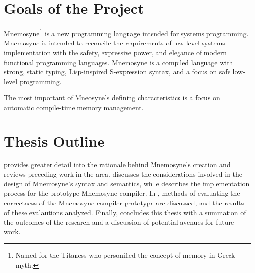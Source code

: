 \section{Goals of the Project}\label{sec:goals}

Mnemosyne\footnote{Named for the Titaness who personified the concept of memory in Greek myth.} is a new programming language intended for systems programming. Mnemosyne is intended to reconcile the requirements of low-level systems implementation with the safety, expressive power, and elegance of modern functional programming languages. Mnemosyne is a compiled language with strong, static typing, Lisp-inspired S-expression syntax, and a focus on safe low-level programming.

The most important of Mneosyne's defining characteristics is a focus on automatic compile-time memory management.

\section{Thesis Outline}\label{sec:outline}

 provides greater detail into the rationale behind Mnemosyne's creation and reviews preceding work in the area.  discusses the considerations involved in the design of Mnemosyne's syntax and semantics, while  describes the implementation process for the prototype Mnemosyne compiler. In , methods of evaluating the correctness of the Mnemosyne compiler prototype are discussed, and the results of these evalautions analyzed. Finally,  concludes this thesis with a summation of the outcomes of the research and a discussion of potential avenues for future work.
